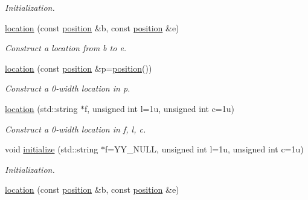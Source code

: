 \begin{DoxyCompactItemize}
\begin{DoxyCompactList}\small\item\em Initialization. \end{DoxyCompactList}\item 
\hypertarget{classyy_1_1location_a0d659c37bcd57075c7bb25e600d3f526}{\hyperlink{classyy_1_1location_a0d659c37bcd57075c7bb25e600d3f526}{location} (const \hyperlink{classyy_1_1position}{position} \&b, const \hyperlink{classyy_1_1position}{position} \&e)}\label{classyy_1_1location_a0d659c37bcd57075c7bb25e600d3f526}

\begin{DoxyCompactList}\small\item\em Construct a location from {\itshape b} to {\itshape e}. \end{DoxyCompactList}\item 
\hypertarget{classyy_1_1location_a378c53e8dc67416748f0b12844919e51}{\hyperlink{classyy_1_1location_a378c53e8dc67416748f0b12844919e51}{location} (const \hyperlink{classyy_1_1position}{position} \&p=\hyperlink{classyy_1_1position}{position}())}\label{classyy_1_1location_a378c53e8dc67416748f0b12844919e51}

\begin{DoxyCompactList}\small\item\em Construct a 0-\/width location in {\itshape p}. \end{DoxyCompactList}\item 
\hypertarget{classyy_1_1location_a75594362f84338b764164cd632ee7d9e}{\hyperlink{classyy_1_1location_a75594362f84338b764164cd632ee7d9e}{location} (std\-::string $\ast$f, unsigned int l=1u, unsigned int c=1u)}\label{classyy_1_1location_a75594362f84338b764164cd632ee7d9e}

\begin{DoxyCompactList}\small\item\em Construct a 0-\/width location in {\itshape f}, {\itshape l}, {\itshape c}. \end{DoxyCompactList}\item 
\hypertarget{classyy_1_1location_a0f7f01fcb693c6ea82f4b087d77fdb38}{void \hyperlink{classyy_1_1location_a0f7f01fcb693c6ea82f4b087d77fdb38}{initialize} (std\-::string $\ast$f=Y\-Y\-\_\-\-N\-U\-L\-L, unsigned int l=1u, unsigned int c=1u)}\label{classyy_1_1location_a0f7f01fcb693c6ea82f4b087d77fdb38}

\begin{DoxyCompactList}\small\item\em Initialization. \end{DoxyCompactList}\item 
\hypertarget{classyy_1_1location_a0d659c37bcd57075c7bb25e600d3f526}{\hyperlink{classyy_1_1location_a0d659c37bcd57075c7bb25e600d3f526}{location} (const \hyperlink{classyy_1_1position}{position} \&b, const \hyperlink{classyy_1_1position}{position} \&e)}\label{classyy_1_1location_a0d659c37bcd57075c7bb25e600d3f526}


\end{DoxyCompactItemize}
